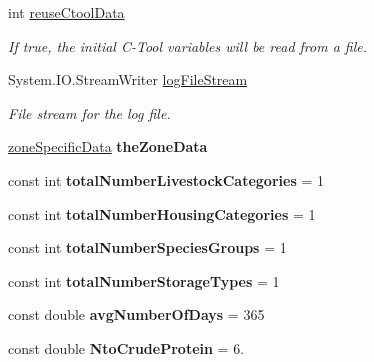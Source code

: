 \begin{DoxyCompactItemize}
int \mbox{\hyperlink{class_global_vars_a9b407972734f633b8f613181750a9c6a}{reuse\+Ctool\+Data}}
\begin{DoxyCompactList}\small\item\em If true, the initial C-\/\+Tool variables will be read from a file. \end{DoxyCompactList}\item 
\mbox{\label{class_global_vars_a887d3b4680e3797b1ae8b50cf1c27cab}} 
System.\+I\+O.\+Stream\+Writer \mbox{\hyperlink{class_global_vars_a887d3b4680e3797b1ae8b50cf1c27cab}{log\+File\+Stream}}
\begin{DoxyCompactList}\small\item\em File stream for the log file. \end{DoxyCompactList}\item 
\mbox{\label{class_global_vars_ad34af19719a8fc947535a16c4d5c76fe}} 
\mbox{\hyperlink{struct_global_vars_1_1zone_specific_data}{zone\+Specific\+Data}} {\bfseries the\+Zone\+Data}
\item 
\mbox{\label{class_global_vars_aa4e88e5ce5c59c8b642c280396988cb5}} 
const int {\bfseries total\+Number\+Livestock\+Categories} = 1
\item 
\mbox{\label{class_global_vars_a4e80a5a5419e29da540273804415745d}} 
const int {\bfseries total\+Number\+Housing\+Categories} = 1
\item 
\mbox{\label{class_global_vars_aaf5354777047b9ba841b4a01b3fca6b9}} 
const int {\bfseries total\+Number\+Species\+Groups} = 1
\item 
\mbox{\label{class_global_vars_a629807f3a2984264729392fe2c2bd3e0}} 
const int {\bfseries total\+Number\+Storage\+Types} = 1
\item 
\mbox{\label{class_global_vars_a7d5c0478f453bab8cc1d05aac2539ee0}} 
const double {\bfseries avg\+Number\+Of\+Days} = 365
\item 
\mbox{\label{class_global_vars_af457f71344887d7f092c0a8190bf47ef}} 
const double {\bfseries Nto\+Crude\+Protein} = 6.
\item 

\end{DoxyCompactItemize}
